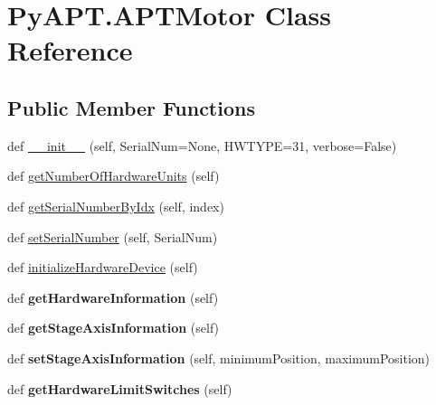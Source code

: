 \hypertarget{class_py_a_p_t_1_1_a_p_t_motor}{}\section{Py\+A\+P\+T.\+A\+P\+T\+Motor Class Reference}
\label{class_py_a_p_t_1_1_a_p_t_motor}
\subsection*{Public Member Functions}
\begin{DoxyCompactItemize}
\item 
def \hyperlink{class_py_a_p_t_1_1_a_p_t_motor_a616004fee7e67ba5a17c50eedc4cadc4}{\+\_\+\+\_\+init\+\_\+\+\_\+} (self, Serial\+Num=None, H\+W\+T\+Y\+PE=31, verbose=False)
\item 
def \hyperlink{class_py_a_p_t_1_1_a_p_t_motor_a5765b2f7f78b962ac15daecd66cd60dc}{get\+Number\+Of\+Hardware\+Units} (self)
\item 
def \hyperlink{class_py_a_p_t_1_1_a_p_t_motor_a796246a873f706852ebb8f6f5a730c33}{get\+Serial\+Number\+By\+Idx} (self, index)
\item 
def \hyperlink{class_py_a_p_t_1_1_a_p_t_motor_ae3df97356ea2a0096d16f51276ee5edb}{set\+Serial\+Number} (self, Serial\+Num)
\item 
def \hyperlink{class_py_a_p_t_1_1_a_p_t_motor_af0b02074305aece4daf902896aecbc5a}{initialize\+Hardware\+Device} (self)
\item 
def {\bfseries get\+Hardware\+Information} (self)\hypertarget{class_py_a_p_t_1_1_a_p_t_motor_a967b435612be2d37d7afd4fb680ffca7}{}\label{class_py_a_p_t_1_1_a_p_t_motor_a967b435612be2d37d7afd4fb680ffca7}

\item 
def {\bfseries get\+Stage\+Axis\+Information} (self)\hypertarget{class_py_a_p_t_1_1_a_p_t_motor_ab42fb4a9c39a10fd4952e084c20443ba}{}\label{class_py_a_p_t_1_1_a_p_t_motor_ab42fb4a9c39a10fd4952e084c20443ba}

\item 
def {\bfseries set\+Stage\+Axis\+Information} (self, minimum\+Position, maximum\+Position)\hypertarget{class_py_a_p_t_1_1_a_p_t_motor_a1f409fafaa2f619f2594be0565042da7}{}\label{class_py_a_p_t_1_1_a_p_t_motor_a1f409fafaa2f619f2594be0565042da7}

\item 
def {\bfseries get\+Hardware\+Limit\+Switches} (self)\hypertarget{class_py_a_p_t_1_1_a_p_t_motor_ab936e49ab6fd32228159af77483f00e4}{}\label{class_py_a_p_t_1_1_a_p_t_motor_ab936e49ab6fd32228159af77483f00e4}


\end{DoxyCompactItemize}
